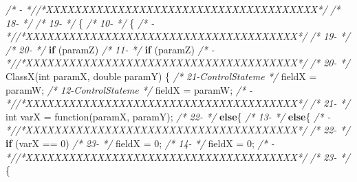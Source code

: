 \documentclass[
]{article}
\newenvironment{Shaded}{\begin{snugshade}}{\end{snugshade}}
\newcommand{\CommentTok}[1]{\textcolor[rgb]{0.56,0.35,0.01}{\textit{#1}}}
\newcommand{\DataTypeTok}[1]{\textcolor[rgb]{0.13,0.29,0.53}{#1}}
\newcommand{\DecValTok}[1]{\textcolor[rgb]{0.00,0.00,0.81}{#1}}
\newcommand{\FunctionTok}[1]{\textcolor[rgb]{0.00,0.00,0.00}{#1}}
\newcommand{\KeywordTok}[1]{\textcolor[rgb]{0.13,0.29,0.53}{\textbf{#1}}}
\newcommand{\NormalTok}[1]{#1}
\begin{document}
\begin{landscape}
\begin{Shaded}
\begin{Highlighting}[]
\CommentTok{/*   -                 *//*XXXXXXXXXXXXXXXXXXXXXXXXXXXXXXXXXXXXXX*/}                     \CommentTok{/* 18-                 */}                                                               
\CommentTok{/* 19-                 */}\NormalTok{    \{                                                          }\CommentTok{/* 10-                 */}\NormalTok{    \{                                                          }
\CommentTok{/*   -                 *//*XXXXXXXXXXXXXXXXXXXXXXXXXXXXXXXXXXXXXX*/}                     \CommentTok{/* 19-                 */}                                                               
\CommentTok{/* 20-                 */}        \KeywordTok{if}\NormalTok{ (paramZ)                                            }\CommentTok{/* 11-                 */}        \KeywordTok{if}\NormalTok{ (paramZ)                                            }
\CommentTok{/*   -                 *//*XXXXXXXXXXXXXXXXXXXXXXXXXXXXXXXXXXXXXX*/}                     \CommentTok{/* 20-                 */}    \FunctionTok{ClassX}\NormalTok{(}\DataTypeTok{int}\NormalTok{ paramX, }\DataTypeTok{double}\NormalTok{ paramY) \{                                }
\CommentTok{/* 21-ControlStateme   */}\NormalTok{            fieldX = paramW;                                   }\CommentTok{/* 12-ControlStateme   */}\NormalTok{            fieldX = paramW;                                   }
\CommentTok{/*   -                 *//*XXXXXXXXXXXXXXXXXXXXXXXXXXXXXXXXXXXXXX*/}                     \CommentTok{/* 21-                 */}        \DataTypeTok{int}\NormalTok{ varX = }\FunctionTok{function}\NormalTok{(paramX, paramY);                          }
\CommentTok{/* 22-                 */}        \KeywordTok{else}\NormalTok{\{                                                  }\CommentTok{/* 13-                 */}        \KeywordTok{else}\NormalTok{\{                                                  }
\CommentTok{/*   -                 *//*XXXXXXXXXXXXXXXXXXXXXXXXXXXXXXXXXXXXXX*/}                     \CommentTok{/* 22-                 */}        \KeywordTok{if}\NormalTok{ (varX == }\DecValTok{0}\NormalTok{)                                         }
\CommentTok{/* 23-                 */}\NormalTok{            fieldX = }\DecValTok{0}\NormalTok{;                                        }\CommentTok{/* 14-                 */}\NormalTok{            fieldX = }\DecValTok{0}\NormalTok{;                                        }
\CommentTok{/*   -                 *//*XXXXXXXXXXXXXXXXXXXXXXXXXXXXXXXXXXXXXX*/}                     \CommentTok{/* 23-                 */}\NormalTok{        \{                                                      }

\end{Highlighting}
\end{Shaded}
\end{landscape}
\end{document}
